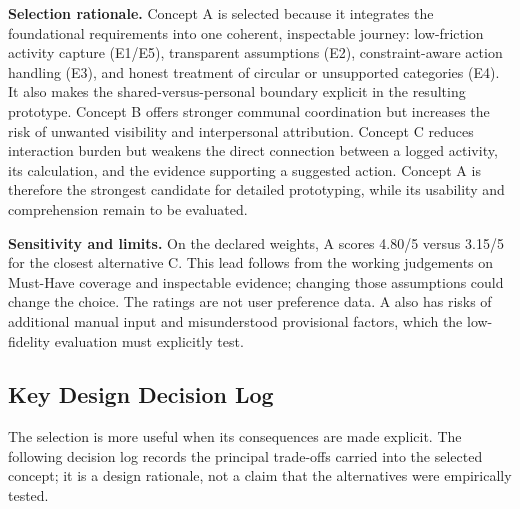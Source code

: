 \documentclass[12pt,a4paper]{article}
\begin{document}
\textbf{Selection rationale.} Concept A is selected because it integrates the foundational requirements into one coherent, inspectable journey: low-friction activity capture (E1/E5), transparent assumptions (E2), constraint-aware action handling (E3), and honest treatment of circular or unsupported categories (E4). It also makes the shared-versus-personal boundary explicit in the resulting prototype. Concept B offers stronger communal coordination but increases the risk of unwanted visibility and interpersonal attribution. Concept C reduces interaction burden but weakens the direct connection between a logged activity, its calculation, and the evidence supporting a suggested action. Concept A is therefore the strongest candidate for detailed prototyping, while its usability and comprehension remain to be evaluated.

\textbf{Sensitivity and limits.} On the declared weights, A scores 4.80/5 versus 3.15/5 for the closest alternative C. This lead follows from the working judgements on Must-Have coverage and inspectable evidence; changing those assumptions could change the choice. The ratings are not user preference data. A also has risks of additional manual input and misunderstood provisional factors, which the low-fidelity evaluation must explicitly test.

\subsection{Key Design Decision Log}
The selection is more useful when its consequences are made explicit. The following decision log records the principal trade-offs carried into the selected concept; it is a design rationale, not a claim that the alternatives were empirically tested.
\end{document}

